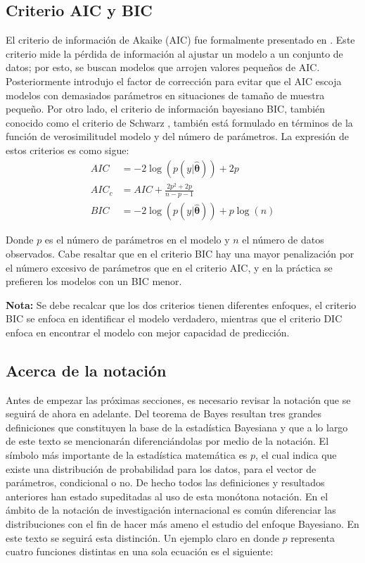 \documentclass[
  spanish,
  letter]{book}
\theoremstyle{definition}
\theoremstyle{definition}
\theoremstyle{definition}
\theoremstyle{remark}
\begin{document}
\hypertarget{criterio-aic-y-bic}{%
\subsection{Criterio AIC y BIC}\label{criterio-aic-y-bic}}

El criterio de información de Akaike (AIC) fue formalmente presentado en . Este criterio mide la pérdida de información al ajustar un modelo a un conjunto de datos; por esto, se buscan modelos que arrojen valores pequeños de AIC. Posteriormente  introdujo el factor de corrección para evitar que el AIC escoja modelos con demasiados parámetros en situaciones de tamaño de muestra pequeño. Por otro lado, el criterio de información bayesiano BIC, también conocido como el criterio de Schwarz \cite{Schwarz}, también está formulado en términos de la función de verosimilitudel modelo y del número de parámetros. La expresión de estos criterios es como sigue:
\begin{align*}
AIC&=-2\log(p(y|\hat{\boldsymbol \theta}))+2p\\
AIC_c&=AIC+\frac{2p^2+2p}{n-p-1}\\
BIC&=-2\log(p(y|\hat{\boldsymbol \theta}))+p\log(n)
\end{align*}

Donde \(p\) es el número de parámetros en el modelo y \(n\) el número de datos observados. Cabe resaltar que en el criterio BIC hay una mayor penalización por el número excesivo de parámetros que en el criterio AIC, y en la práctica se prefieren los modelos con un BIC menor.

\textbf{Nota:} Se debe recalcar que los dos criterios tienen diferentes enfoques, el criterio BIC se enfoca en identificar el modelo verdadero, mientras que el criterio DIC enfoca en encontrar el modelo con mejor capacidad de predicción.

\hypertarget{acerca-de-la-notaciuxf3n}{%
\subsection{Acerca de la notación}\label{acerca-de-la-notaciuxf3n}}

Antes de empezar las próximas secciones, es necesario revisar la notación que se seguirá de ahora en adelante. Del teorema de Bayes resultan tres grandes definiciones que constituyen la base de la estadística Bayesiana y que a lo largo de este texto se mencionarán diferenciándolas por medio de la notación. El símbolo más importante de la estadística matemática es \(p\), el cual indica que existe una distribución de probabilidad para los datos, para el vector de parámetros, condicional o no. De hecho todos las definiciones y resultados anteriores han estado supeditadas al uso de esta monótona notación. En el ámbito de la notación de investigación internacional es común diferenciar las distribuciones con el fin de hacer más ameno el estudio del enfoque Bayesiano. En este texto se seguirá esta distinción. Un ejemplo claro en donde \(p\) representa cuatro funciones distintas en una sola ecuación es el siguiente:
\end{document}
